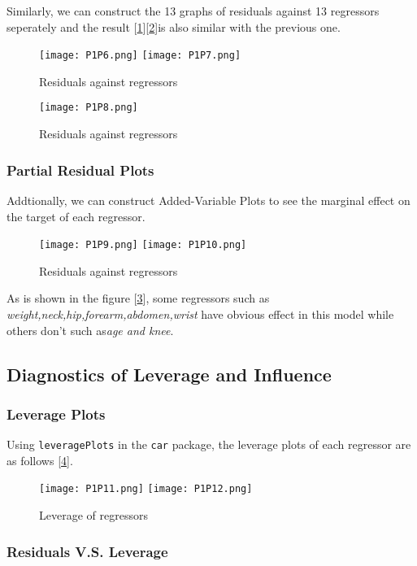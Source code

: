 \documentclass[11pt]{article}
\begin{document}
Similarly, we can construct the 13 graphs of residuals against 13 regressors seperately and the result [\ref{Fig6}][\ref{Fig7}]is also similar with the previous one.

\begin{figure}[!htb]
\centering
\texttt{[image: P1P6.png]}
\texttt{[image: P1P7.png]}
\caption{Residuals against regressors}\label{Fig6}
\end{figure}

\begin{figure}[!htb]
\centering
\texttt{[image: P1P8.png]}
\caption{Residuals against regressors}\label{Fig7}
\end{figure}

\subsubsection{Partial Residual Plots}

Addtionally, we can construct Added-Variable Plots to see the marginal effect on the target of each regressor.

\begin{figure}[!htb]
\centering
\texttt{[image: P1P9.png]}
\texttt{[image: P1P10.png]}
\caption{Residuals against regressors}\label{Fig8}
\end{figure}

As is shown in the figure [\ref{Fig8}], some regressors such as {\it weight,neck,hip,forearm,abdomen,wrist} have obvious effect in this model while others don't such as{\it age and knee}.


\subsection{Diagnostics of Leverage and Influence} \label{ch3}


\subsubsection{Leverage Plots}

Using \verb|leveragePlots| in the \verb|car| package, the leverage plots of each regressor are as follows [\ref{Fig9}].
\begin{figure}[!htb]
\centering
\texttt{[image: P1P11.png]}
\texttt{[image: P1P12.png]}
\caption{Leverage of regressors}\label{Fig9}
\end{figure}


\subsubsection{Residuals V.S. Leverage} 
\end{document}
